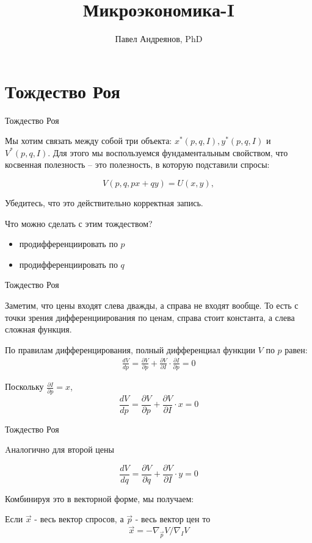 \documentclass{beamer}
\title{
Микроэкономика-I
}
\author{
Павел Андреянов, PhD
}
\begin{document}
\maketitle

\section{Тождество Роя}

\begin{frame}{Тождество Роя}

Мы хотим связать между собой три объекта: $x^{\ast}(p,q,I), y^{\ast}(p,q,I)$ и  $V^{\ast}(p,q,I)$. Для этого мы воспользуемся фундаментальным свойством, что косвенная полезность – это полезность, в которую подставили спросы:

$$V(p, q, px + qy) = U(x, y),$$

Убедитесь, что это действительно корректная запись.

Что можно сделать с этим тождеством?
\begin{itemize}
\item продифференциировать по $p$
\item продифференциировать по $q$
\end{itemize}

\end{frame}


\begin{frame}{Тождество Роя}

Заметим, что цены входят слева дважды, а справа не входят вообще. То есть с точки зрения дифференциирования по ценам, справа стоит константа, а слева сложная функция. 

По правилам дифференцирования, полный дифференциал функции $V$ по $p$ равен:
\begin{gather*}
\frac{d V}{d p} = \frac{\partial V}{\partial p} + \frac{\partial V}{\partial I} \cdot \frac{\partial I}{\partial p} = 0
\end{gather*}

Поскольку $\frac{\partial I}{\partial p} = x$, 
$$\frac{d V}{d p} = \frac{\partial V}{\partial p} + \frac{\partial V}{\partial I} \cdot x = 0$$

\end{frame}

\begin{frame}{Тождество Роя}

Aналогично для второй цены

$$\frac{d V}{d q} = \frac{\partial V}{\partial q} + \frac{\partial V}{\partial I} \cdot y = 0$$

Комбинируя это в векторной форме, мы получаем:

\begin{theorem}
Если $\vec{x}$ - весь вектор спросов, а $\vec{p}$ - весь вектор цен то
$$\vec{x} = - \nabla_{\vec{p}} V / \nabla_I V$$
\end{theorem}

\end{frame}
\end{document}
